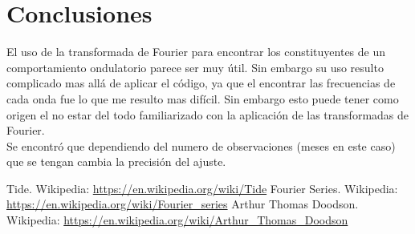 \documentclass[12pt,letterpaper]{article}
\begin{document}
\section{Conclusiones} 

El uso de la transformada de Fourier para encontrar los constituyentes de un comportamiento ondulatorio parece ser muy útil. Sin embargo su uso resulto complicado mas allá de aplicar el código, ya que el encontrar las frecuencias de cada onda fue lo que me resulto mas difícil. Sin embargo esto puede tener como origen el no estar del todo familiarizado con la aplicación de las transformadas de Fourier.\\
Se encontró que dependiendo del numero de observaciones (meses en este caso) que se tengan cambia la precisión del ajuste.

\begin{thebibliography}{2}

 Tide. Wikipedia: \url{https://en.wikipedia.org/wiki/Tide}
 Fourier Series. Wikipedia: \url{https://en.wikipedia.org/wiki/Fourier_series}
 Arthur Thomas Doodson. Wikipedia: \url{https://en.wikipedia.org/wiki/Arthur_Thomas_Doodson}

\end{thebibliography}
\end{document}
